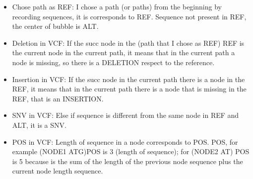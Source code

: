 \begin{itemize}
\item Chose path as REF: I chose a path (or paths) from the beginning by recording sequences, it is corresponds to REF. Sequence not present in REF, the center of bubble is ALT.

                    

                    
\item Deletion in VCF: If the succ node in the (path that I chose as REF) REF is the current node in the current path, it means that in the current path a node is missing, so there is a DELETION respect to the reference.

\item Insertion in VCF: If the succ node in the current path there is a node in the REF, it means that in the current path there is a node that is missing in the REF, that is an INSERTION.

\item SNV in VCF: Else if sequence is different from the same node in REF and ALT, it is a SNV.

\item POS in VCF: Length of sequence in a node corresponds to POS.
POS, for example (NODE1 ATG)POS is 3 (length of sequence); for (NODE2 AT) POS is 5 because is the sum of the length of the previous node sequence plus the current node length sequence.   
\end{itemize}


